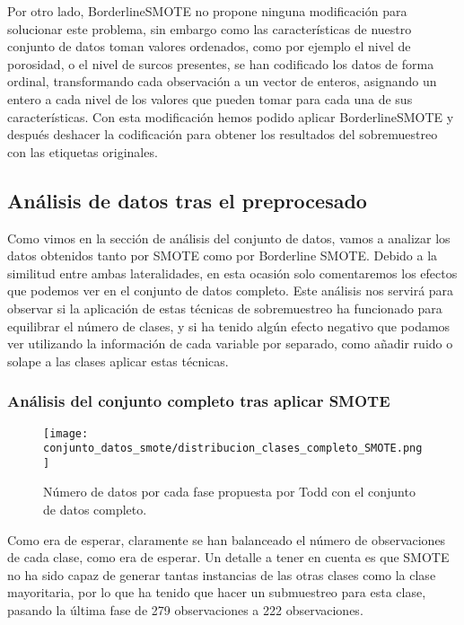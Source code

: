 Por otro lado, BorderlineSMOTE no propone ninguna modificación para solucionar este problema, sin embargo como las características de nuestro conjunto de datos toman valores ordenados, como por ejemplo el nivel de porosidad, o el nivel de surcos presentes, se han codificado los datos de forma ordinal, transformando cada observación a un vector de enteros, asignando un entero a cada nivel de los valores que pueden tomar para cada una de sus características. Con esta modificación hemos podido aplicar BorderlineSMOTE y después deshacer la codificación para obtener los resultados del sobremuestreo con las etiquetas originales.

\subsection{Análisis de datos tras el preprocesado}

Como vimos en la sección de análisis del conjunto de datos, vamos a analizar los datos obtenidos tanto por SMOTE como por Borderline SMOTE. Debido a la similitud entre ambas lateralidades, en esta ocasión solo comentaremos los efectos que podemos ver en el conjunto de datos completo. Este análisis nos servirá para observar si la aplicación de estas técnicas de sobremuestreo ha funcionado para equilibrar el número de clases, y si ha tenido algún efecto negativo que podamos ver utilizando la información de cada variable por separado, como añadir ruido o solape a las clases aplicar estas técnicas.

\subsubsection{Análisis del conjunto completo tras aplicar SMOTE}


\begin{figure}[H]
	\centering
	\texttt{[image: conjunto\_datos\_smote/distribucion\_clases\_completo\_SMOTE.png]}
	\caption{Número de datos por cada fase propuesta por Todd con el conjunto de datos completo.}
	\label{fig:conteo_c_smote}
\end{figure}

Como era de esperar, claramente se han balanceado el número de observaciones de cada clase, como era de esperar. Un detalle a tener en cuenta es que SMOTE no ha sido capaz de generar tantas instancias de las otras clases como la clase mayoritaria, por lo que ha tenido que hacer un submuestreo para esta clase, pasando la última fase de 279 observaciones a 222 observaciones.

